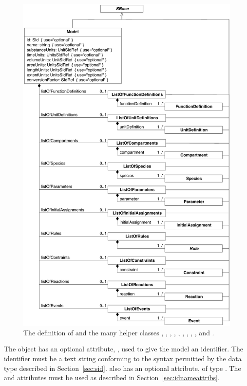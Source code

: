 \begin{figure}[htb]
  \centering
  \includegraphics[scale=0.75]{figs/model-uml}
  \caption{The definition of \Model and the many helper
      classes \ListOfFunctionDefinitions, \ListOfUnitDefinitions,
      \ListOfCompartments, \ListOfSpecies, \ListOfParameters,
      \ListOfInitialAssignments, \ListOfRules, \ListOfConstraints,
      \ListOfReactions, and \ListOfEvents.}
  \label{fig:model}
\end{figure}

The \Model object has an optional attribute, , used to
give the model an identifier.  The identifier must be a text
string conforming to the syntax permitted by the 
data type described in Section~\ref{sec:sid}.  \Model also has an
optional  attribute, of type .  The
 and  attributes must be used as described in
Section~\ref{sec:idnameattribs}.

